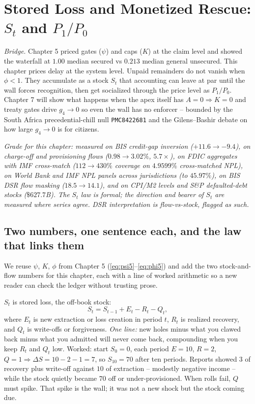 \chapter{Stored Loss and Monetized Rescue: $S_t$ and $P_1/P_0$}
\label{ch:storedloss}

\textit{Bridge.} Chapter 5 priced gates ($\psi$) and caps ($K$) at the claim level and showed the waterfall at $1.00$ median secured vs $0.213$ median general unsecured. This chapter prices delay at the system level. Unpaid remainders do not vanish when $\phi<1$. They accumulate as a stock $S_t$ that accounting can leave at par until the wall forces recognition, then get socialized through the price level as $P_1/P_0$. Chapter 7 will show what happens when the apex itself has $A=0\Rightarrow K=0$ and treaty gates drive $g_4\to0$ so even the wall has no enforcer -- bounded by the South Africa precedential-chill null \texttt{PMC8422681} and the Gilens--Bashir debate on how large $g_4\to0$ is for citizens.

\textit{Grade for this chapter: measured on BIS credit-gap inversion ($+11.6\to-9.4$), on charge-off and provisioning flows ($0.98\to3.02\%$, $5.7\times$), on FDIC aggregates with IMF cross-match ($112\to430\%$ coverage on $4.9599\%$ cross-matched NPL), on World Bank and IMF NPL panels across jurisdictions (to $45.97\%$), on BIS DSR flow masking ($18.5\to14.1$), and on CPI/M2 levels and S\&P defaulted-debt stocks ($\$627.7$B). The $S_t$ law is formal; the direction and bearer of $S_t$ are measured where series agree. DSR interpretation is flow-vs-stock, flagged as such.}

\section{Two numbers, one sentence each, and the law that links them}
\label{sec:stored-defs}

We reuse $\psi$, $K$, $\phi$ from Chapter 5 (\ref{eq:psi5}--\ref{eq:phi5}) and add the two stock-and-flow numbers for this chapter, each with a line of worked arithmetic so a new reader can check the ledger without trusting prose.

$S_t$ is stored loss, the off-book stock:
\begin{equation}
S_t = S_{t-1}+E_t-R_t-Q_t,
\label{eq:St6}
\end{equation}
where $E_t$ is new extraction or loss creation in period $t$, $R_t$ is realized recovery, and $Q_t$ is write-offs or forgiveness. \textit{One line:} new holes minus what you clawed back minus what you admitted will never come back, compounding when you keep $R_t$ and $Q_t$ low. Worked: start $S_0=0$, each period $E=10$, $R=2$, $Q=1\Rightarrow\Delta S=10-2-1=7$, so $S_{10}=70$ after ten periods. Reports showed $3$ of recovery plus write-off against $10$ of extraction -- modestly negative income -- while the stock quietly became $70$ off or under-provisioned. When rolls fail, $Q$ must spike. That spike is the wall; it was not a new shock but the stock coming due.

